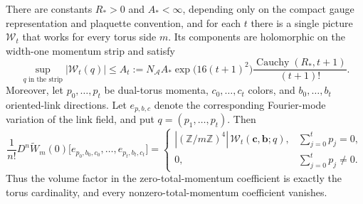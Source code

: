 \begin{proposition}
\label{prop:ex-wilson-stream}
There are constants $R_*>0$ and $A_*<\infty$, depending only on the compact
gauge representation and plaquette convention, and for each $t$ there is a
single picture $\mathcal W_t$ that works for every torus side $m$. Its
components are holomorphic on the width-one momentum strip and satisfy
\[
 \sup_{q\text{ in the strip}}|\mathcal W_t(q)|\leq
 A_t:=N_{\mathcal A}A_*\exp\bigl(16(t+1)^2\bigr)
       \frac{\operatorname{Cauchy}(R_*,t+1)}{(t+1)!}.
\]
Moreover, let $p_0,\ldots,p_t$ be dual-torus momenta, $c_0,\ldots,c_t$
colors, and $b_0,\ldots,b_t$ oriented-link directions. Let $e_{p,b,c}$
denote the corresponding Fourier-mode variation of the link field, and put
$q=(p_1,\ldots,p_t)$. Then
\[
 \frac{1}{n!}D^n \widetilde W_m(0)\bigl[e_{p_0,b_0,c_0},\ldots,e_{p_t,b_t,c_t}\bigr]
 =\begin{cases}
 |(\mathbb Z/m\mathbb Z)^4|\,\mathcal W_t(\mathbf c,\mathbf b;q),
       &\sum_{j=0}^t p_j=0,\\
 0,&\sum_{j=0}^t p_j\ne0.
 \end{cases}
\]
Thus the volume factor in the zero-total-momentum coefficient is exactly the
torus cardinality, and every nonzero-total-momentum coefficient vanishes.
\end{proposition}


